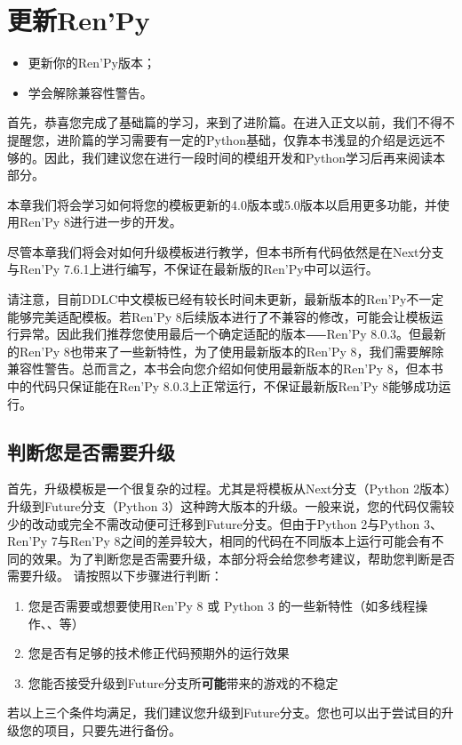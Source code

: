 \documentclass[../../Main.tex]{subfiles}
\begin{document}
\chapter{更新Ren'Py}
\label{chap:7}

\begin{ChapterGoals}
    \begin{itemize}
        \item 更新你的Ren'Py版本；
        \item 学会解除兼容性警告。
    \end{itemize}
\end{ChapterGoals}

首先，恭喜您完成了基础篇的学习，来到了进阶篇。在进入正文以前，我们不得不提醒您，进阶篇的学习需要有一定的Python基础，仅靠本书浅显的介绍是远远不够的。因此，我们建议您在进行一段时间的模组开发和Python学习后再来阅读本部分。

本章我们将会学习如何将您的模板更新的4.0版本或5.0版本以启用更多功能，并使用Ren'Py 8进行进一步的开发。

\begin{Attention}
    尽管本章我们将会对如何升级模板进行教学，但本书所有代码依然是在Next分支与Ren'Py 7.6.1上进行编写，不保证在最新版的Ren'Py中可以运行。
\end{Attention}

\begin{Warning}
    请注意，目前DDLC中文模板已经有较长时间未更新，最新版本的Ren'Py不一定能够完美适配模板。若Ren'Py 8后续版本进行了不兼容的修改，可能会让模板运行异常。因此我们推荐您使用最后一个确定适配的版本⸺Ren'Py 8.0.3。但最新的Ren'Py 8也带来了一些新特性，为了使用最新版本的Ren'Py 8，我们需要解除兼容性警告。总而言之，本书会向您介绍如何使用最新版本的Ren'Py 8，但本书中的代码只保证能在Ren'Py 8.0.3上正常运行，不保证最新版Ren'Py 8能够成功运行。
\end{Warning}

\section{判断您是否需要升级}
首先，升级模板是一个很复杂的过程。尤其是将模板从Next分支（Python 2版本）升级到Future分支（Python 3）这种跨大版本的升级。一般来说，您的代码仅需较少的改动或完全不需改动便可迁移到Future分支。但由于Python 2与Python 3、Ren'Py 7与Ren'Py 8之间的差异较大，相同的代码在不同版本上运行可能会有不同的效果。为了判断您是否需要升级，本部分将会给您参考建议，帮助您判断是否需要升级。
请按照以下步骤进行判断：
\begin{enumerate}
    \item 您是否需要或想要使用Ren'Py 8 或 Python 3 的一些新特性（如多线程操作、、等）
    \item 您是否有足够的技术修正代码预期外的运行效果
    \item 您能否接受升级到Future分支所\textbf{可能}带来的游戏的不稳定
\end{enumerate}
若以上三个条件均满足，我们建议您升级到Future分支。您也可以出于尝试目的升级您的项目，只要先进行备份。
\end{document}
